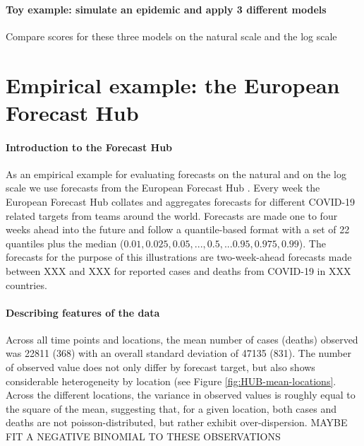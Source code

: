 \documentclass{article}
\begin{document}


\paragraph{Toy example: simulate an epidemic and apply 3 different models} Compare scores for these three models on the natural scale and the log scale


\section{Empirical example: the European Forecast Hub}

\paragraph{Introduction to the Forecast Hub} As an empirical example for evaluating forecasts on the natural and on the log scale we use forecasts from the European Forecast Hub \citep{europeancovid-19forecasthubEuropeanCovid19Forecast2021}. Every week the European Forecast Hub collates and aggregates forecasts for different COVID-19 related targets from teams around the world. Forecasts are made one to four weeks ahead into the future and follow a quantile-based format with a set of 22 quantiles plus the median ($0.01, 0.025, 0.05, ..., 0.5, ... 0.95, 0.975, 0.99$). The forecasts for the purpose of this illustrations are two-week-ahead forecasts made between XXX and XXX for reported cases and deaths from COVID-19 in XXX countries. 

\paragraph{Describing features of the data}
Across all time points and locations, the mean number of cases (deaths) observed was 22811 (368) with an overall standard deviation of 47135 (831). The number of observed value does not only differ by forecast target, but also shows considerable heterogeneity by location (see Figure \ref{fig:HUB-mean-locations}. Across the different locations, the variance in observed values is roughly equal to the square of the mean, suggesting that, for a given location, both cases and deaths are not poisson-distributed, but rather exhibit over-dispersion. 
MAYBE FIT A NEGATIVE BINOMIAL TO THESE OBSERVATIONS
\end{document}
